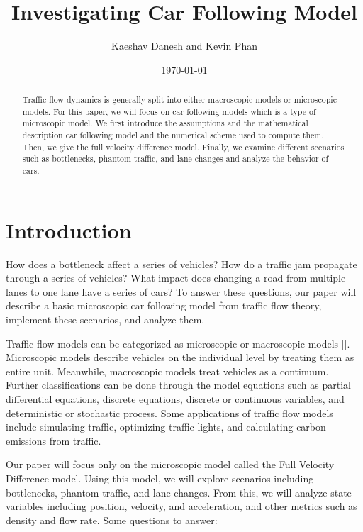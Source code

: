\documentclass[12pt]{article}
\title{Investigating Car Following Model}
\author{Kaeshav Danesh and Kevin Phan}
\date{\today}
\begin{document}
    \maketitle

    \begin{abstract}
        Traffic flow dynamics is generally split into either macroscopic models or microscopic models. For this paper, we will focus on car following models which is a type of microscopic model. We first introduce the assumptions and the mathematical description car following model and the numerical scheme used to compute them. Then, we give the full velocity difference model. Finally, we examine different scenarios such as bottlenecks, phantom traffic, and lane changes and analyze the behavior of cars. 
    \end{abstract}

    \newpage

    \tableofcontents

    \newpage

    \section{Introduction}
    How does a bottleneck affect a series of vehicles? How do a traffic jam propagate through a series of vehicles? What impact does changing a road from multiple lanes to one lane have a series of cars? To answer these questions, our paper will describe a basic microscopic car following model from traffic flow theory, implement these scenarios, and analyze them. 

    Traffic flow models can be categorized as microscopic or macroscopic models [\cite{hisTraffic}]. Microscopic models describe vehicles on the individual level by treating them as entire unit. Meanwhile, macroscopic models treat vehicles as a continuum. Further classifications can be done through the model equations such as partial differential equations, discrete equations, discrete or continuous variables, and deterministic or stochastic process. Some applications of traffic flow models include simulating traffic, optimizing traffic lights, and calculating carbon emissions from traffic. 

    Our paper will focus only on the microscopic model called the Full Velocity Difference model. Using this model, we will explore scenarios including bottlenecks, phantom traffic, and lane changes. From this, we will analyze state variables including position, velocity, and acceleration, and other metrics such as density and flow rate. 
    Some questions to answer:
\end{document}

